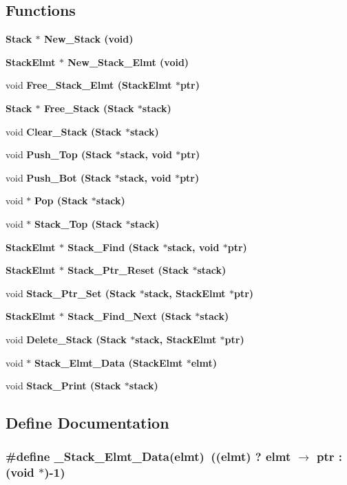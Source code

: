 \subsection*{Functions}
\begin{CompactItemize}
\item 
\bf{Stack} $\ast$ \bf{New\_\-Stack} (void)
\item 
\bf{Stack\-Elmt} $\ast$ \bf{New\_\-Stack\_\-Elmt} (void)
\item 
void \bf{Free\_\-Stack\_\-Elmt} (\bf{Stack\-Elmt} $\ast$ptr)
\item 
\bf{Stack} $\ast$ \bf{Free\_\-Stack} (\bf{Stack} $\ast$\bf{stack})
\item 
void \bf{Clear\_\-Stack} (\bf{Stack} $\ast$\bf{stack})
\item 
void \bf{Push\_\-Top} (\bf{Stack} $\ast$\bf{stack}, void $\ast$ptr)
\item 
void \bf{Push\_\-Bot} (\bf{Stack} $\ast$\bf{stack}, void $\ast$ptr)
\item 
void $\ast$ \bf{Pop} (\bf{Stack} $\ast$\bf{stack})
\item 
void $\ast$ \bf{Stack\_\-Top} (\bf{Stack} $\ast$\bf{stack})
\item 
\bf{Stack\-Elmt} $\ast$ \bf{Stack\_\-Find} (\bf{Stack} $\ast$\bf{stack}, void $\ast$ptr)
\item 
\bf{Stack\-Elmt} $\ast$ \bf{Stack\_\-Ptr\_\-Reset} (\bf{Stack} $\ast$\bf{stack})
\item 
void \bf{Stack\_\-Ptr\_\-Set} (\bf{Stack} $\ast$\bf{stack}, \bf{Stack\-Elmt} $\ast$ptr)
\item 
\bf{Stack\-Elmt} $\ast$ \bf{Stack\_\-Find\_\-Next} (\bf{Stack} $\ast$\bf{stack})
\item 
void \bf{Delete\_\-Stack} (\bf{Stack} $\ast$\bf{stack}, \bf{Stack\-Elmt} $\ast$ptr)
\item 
void $\ast$ \bf{Stack\_\-Elmt\_\-Data} (\bf{Stack\-Elmt} $\ast$elmt)
\item 
void \bf{Stack\_\-Print} (\bf{Stack} $\ast$\bf{stack})
\end{CompactItemize}


\subsection{Define Documentation}
\subsubsection{\setlength{\rightskip}{0pt plus 5cm}\#define \_\-Stack\_\-Elmt\_\-Data(elmt)~((elmt) ? elmt $\rightarrow$ ptr : (void $\ast$)-1)}\label{stack_8h_d1a7c09164b0376b87960a20e57e88ab}




